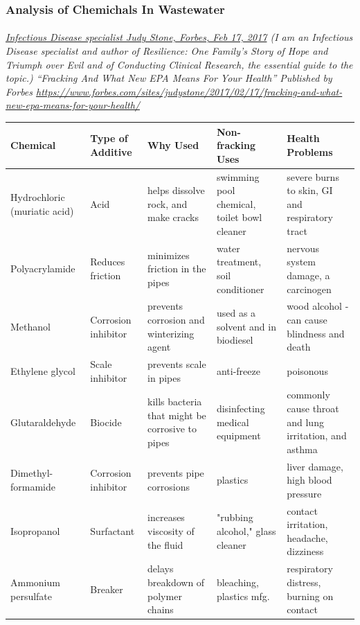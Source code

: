 \documentclass{article}
\begin{document}
\begin{table}[h!]
\subsubsection{Analysis of Chemichals In Wastewater}
\paragraph{}
\small
\textit{
\underline{Infectious Disease specialist Judy Stone, Forbes, Feb 17, 2017}
(I am an Infectious Disease specialist and author of Resilience: One Family's Story of Hope and Triumph over Evil and of Conducting Clinical Research, the essential guide to the topic.) ``Fracking And What New EPA Means For Your Health'' Published by Forbes   
\url{https://www.forbes.com/sites/judystone/2017/02/17/fracking-and-what-new-epa-means-for-your-health/}}
\normalsize
  \begin{center}
    \begin{tabular}{p{2.5cm} | p{1.7cm} | p{3cm} | p{3.5cm} | p{4.2cm}}  %
      \textbf{Chemical} & \textbf{Type of Additive} & \textbf{Why Used}& \textbf{Non-fracking Uses}& \textbf{Health Problems}\\

      \midrule
      Hydrochloric (muriatic acid) & Acid & helps dissolve rock, and make cracks & swimming pool chemical, toilet bowl cleaner & severe burns to skin, GI and respiratory tract\\
      \midrule
      Polyacrylamide & Reduces friction & minimizes friction in the pipes & water treatment, soil conditioner & nervous system damage, a carcinogen\\
      \midrule
      Methanol&Corrosion inhibitor&prevents corrosion and winterizing agent&used as a solvent and in biodiesel&wood alcohol - can cause blindness and death\\
      \midrule
      Ethylene glycol&Scale inhibitor&prevents scale in pipes&anti-freeze&poisonous\\
      \midrule
      Glutaraldehyde&Biocide&kills bacteria that might be corrosive to pipes&disinfecting medical equipment&commonly cause throat and lung irritation, and asthma\\
      \midrule
      Dimethyl-formamide&Corrosion inhibitor&prevents pipe corrosions&plastics&liver damage, high blood pressure\\
      \midrule
      Isopropanol&Surfactant&increases viscosity of the fluid&"rubbing alcohol," glass cleaner&contact irritation, headache, dizziness\\
      \midrule
      Ammonium persulfate&Breaker&delays breakdown of polymer chains&bleaching, plastics mfg.&respiratory distress, burning on contact

    \end{tabular}
  \end{center}
\end{table}
\end{document}
